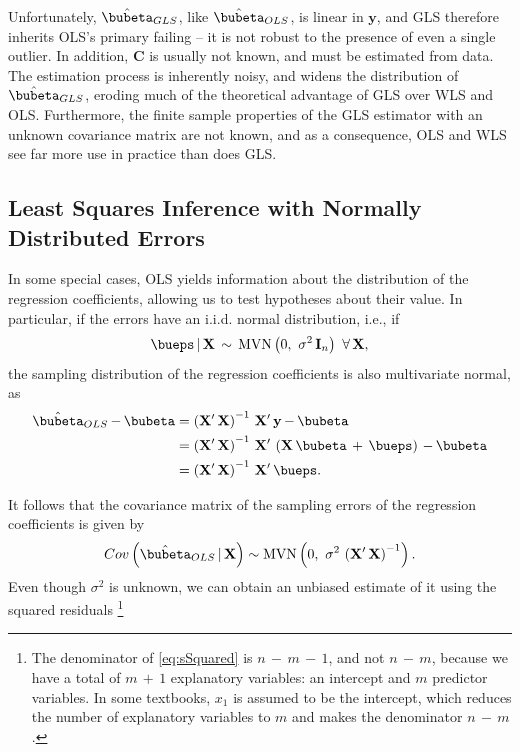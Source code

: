\documentclass[graybox,envcountchap,sectrefs]{svmono}\usepackage[]{graphicx}\usepackage[]{xcolor}
\begin{document}
\begin{appendices}
Unfortunately, $\hat{\bubeta}_{GLS}$, like $\hat{\bubeta}_{OLS}$,
is linear in $\mathrm{\mathbf{y}}$, and GLS therefore inherits OLS's
primary failing -- it is not robust to the presence of even a single
outlier. In addition, $\mathrm{\mathbf{C}}$ is usually not known,
and must be estimated from data. The estimation process is inherently
noisy, and widens the distribution of $\hat{\bubeta}_{GLS}$, eroding
much of the theoretical advantage of GLS over WLS and OLS. Furthermore,
the finite sample properties of the GLS estimator with an unknown
covariance matrix are not known, and as a consequence, OLS and WLS
see far more use in practice than does GLS. 

\subsection{Least Squares Inference with Normally Distributed Errors}

In some special cases, OLS yields information about the distribution
of the regression coefficients, allowing us to test hypotheses about
their value. In particular, if the errors have an i.i.d. normal distribution,
i.e., if
\begin{equation}
\bueps\,|\,\mathrm{\mathbf{X}}\,\sim\,\mathrm{MVN}\left(0,\ \sigma^{2}\,\mathrm{\mathbf{I}}_{n}\right)\ \forall\,\mathbf{X},\label{eq:MultivariateNormalErrors}
\end{equation}
the sampling distribution of the regression coefficients is also multivariate
normal, as
\begin{align}
\hat{\bubeta}_{OLS}\,\mathrm{-\,}\bubeta & =\left(\mathrm{\mathbf{X}}^{\prime}\,\mathrm{\mathbf{X}}\right)^{-1}\,\mathrm{\mathbf{X}}^{\prime}\,\mathrm{\mathbf{y}}\,\mathrm{-\,}\bubeta\nonumber \\
 & =\left(\mathrm{\mathbf{X}}^{\prime}\,\mathrm{\mathbf{X}}\right)^{-1}\,\mathrm{\mathbf{X}}^{\prime}\,\left(\mathrm{\mathbf{X}}\,\bubeta\,+\,\bueps\right)\,\mathrm{-\,}\bubeta\nonumber \\
 & =\left(\mathrm{\mathbf{X}}^{\prime}\,\mathrm{\mathbf{X}}\right)^{-1}\,\mathrm{\mathbf{X}}^{\prime}\,\bueps.\label{eq:BetaRelatesToEpsilon}
\end{align}

It follows that the covariance matrix of the sampling errors of the
regression coefficients is given by
\begin{equation}
Cov\left(\hat{\bubeta}_{OLS}\,|\,\mathrm{\mathbf{X}}\right)\sim\mathrm{MVN}\left(0,\ \sigma^{2}\,\left(\mathrm{\mathbf{X}}^{\prime}\,\mathrm{\mathbf{X}}\right)^{-1}\right).\label{eq:MultivariateNormalSamplingErrors}
\end{equation}
Even though $\sigma^{2}$ is unknown, we can obtain an unbiased estimate
of it using the squared residuals \footnote{The denominator of \eqref{eq:sSquared} is $n\,-\,m\,-\,1$, and not
$n\,-\,m$, because we have a total of $m\,+\,1$ explanatory variables:
an intercept and $m$ predictor variables. In some textbooks, $x_{1}$
is assumed to be the intercept, which reduces the number of explanatory
variables to $m$ and makes the denominator $n\,-\,m$.}


\end{appendices}
\end{document}
